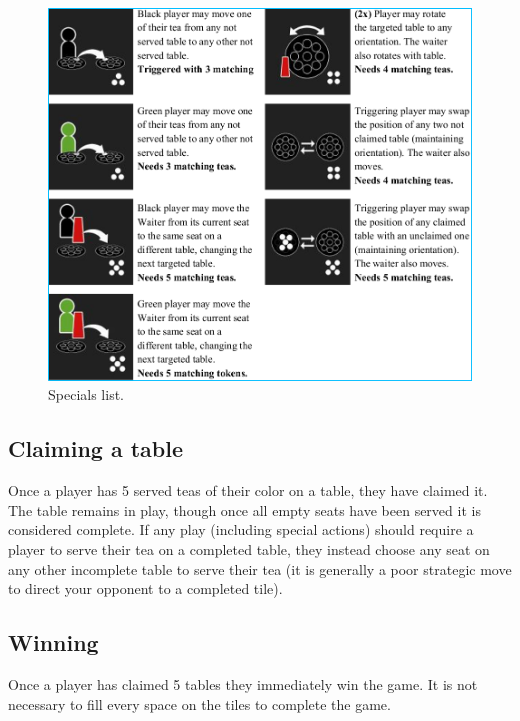 \documentclass[a4paper]{article}
\begin{document}
\begin{figure}[H]
\centering
{}
  \includegraphics[width=\linewidth]{specials.png}
  \caption{Specials list.}\label{fig:specials}
\endminipage\hfill

\end{figure}

\subsection{Claiming a table}
Once a player has 5 served teas of their color on a table, they have claimed it. The table
remains in play, though once all empty seats have been served it is considered complete. If any
play (including special actions) should require a player to serve their tea on a completed table,
they instead choose any seat on any other incomplete table to serve their tea (it is generally a
poor strategic move to direct your opponent to a completed tile).


\subsection{Winning}
Once a player has claimed 5 tables they immediately win the game. It is not necessary to
fill every space on the tiles to complete the game.



\newpage
\end{document}
